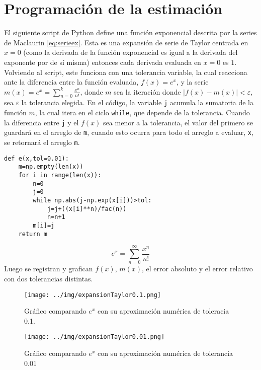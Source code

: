 \documentclass[../portafolio.tex]{subfiles}
\begin{document}
\section{Programación de la estimación}
El siguiente script de Python define una función exponencial descrita por la series de Maclaurin \eqref{eq:serieex}. Esta es una expansión de serie de Taylor centrada en $x=0$ (como la derivada de la función exponencial es igual a la derivada del exponente por de sí misma) entonces cada derivada evaluada en $x=0$ es $1$.\\
Volviendo al script, este funciona con una tolerancia variable, la cual reacciona ante la diferencia entre la función evaluada, $f(x)=e^x$, y la serie $m(x)=e^x=\sum_{n=0}^{k} \frac{x^n}{n!}$, donde $m$ sea la iteración donde $|f(x)-m(x)|<\varepsilon$, sea $\varepsilon$ la tolerancia elegida. En el código, la variable \texttt{j} acumula la sumatoria de la función $m$, la cual itera en el ciclo \texttt{while}, que depende de la tolerancia. Cuando la diferencia entre \texttt{j} y el $f(x)$ sea menor a la tolerancia, el valor del primero se guardará en el arreglo de \texttt{m}, cuando esto ocurra para todo el arreglo a evaluar, \texttt{x}, se retornará el arreglo \texttt{m}.
\begin{verbatim}
def e(x,tol=0.01):
    m=np.empty(len(x))
    for i in range(len(x)):
        n=0
        j=0
        while np.abs(j-np.exp(x[i]))>tol:
            j=j+((x[i]**n)/fac(n))
            n=n+1
        m[i]=j
    return m
\end{verbatim}
\begin{equation}\label{eq:serieex}
e^x=\sum_{n=0}^{\infty}\frac{x^n}{n!}
\end{equation}
Luego se registran y grafican $f(x)$, $m(x)$, el error absoluto y el error relativo con dos tolerancias distintas.

\begin{figure}
\centering
\texttt{[image: ../img/expansionTaylor0.1.png]} 
\caption{Gráfico comparando $e^x$ con su aproximación numérica de toleracia 0.1.}\label{fig:tol0.1}
\end{figure}

\begin{figure}
\centering
\texttt{[image: ../img/expansionTaylor0.01.png]} 
\caption{Gráfico comparando $e^x$ con su aproximación numérica de tolerancia 0.01}\label{fig:tol0.01}
\end{figure}
\end{document}
